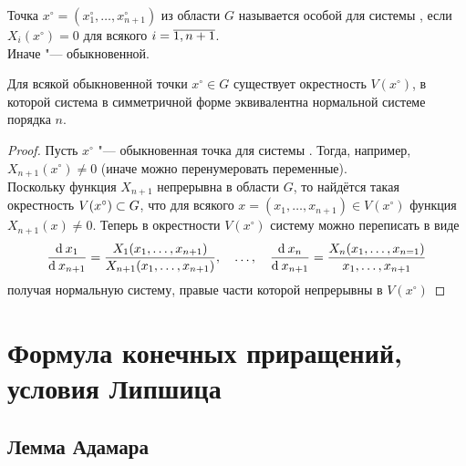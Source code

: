\begin{definition}
    Точка $ x^\circ = (x_1^\circ, \dots, x_{n + 1}^\circ) $ из области $ G $ называется особой для системы , если $ X_i(x^\circ) = 0 $ для всякого $ i = \overline{1, n + 1} $. \\
    Иначе "--- обыкновенной.
\end{definition}

\begin{theorem}
    Для всякой обыкновенной точки $ x^\circ \in G $ существует окрестность $ V(x^\circ) $, в которой система в симметричной форме  эквивалентна нормальной системе  порядка $ n $.
\end{theorem}

\begin{proof}
    Пусть $ x^\circ $ "--- обыкновенная точка для системы . Тогда, например, $ X_{n + 1}(x^\circ) \ne 0 $ (иначе можно перенумеровать переменные). \\
    Поскольку функция $ X_{n + 1} $ непрерывна в области $ G $, то найдётся такая окрестность $ V(x^\circ) \subset G $, что для всякого $ x = (x_1, \dots, x_{n + 1}) \in V(x^\circ) $ функция $ X_{n + 1}(x) \ne 0 $. Теперь в окрестности $ V(x^\circ) $ систему  можно переписать в виде
    $$ \frac{\operatorname{d}^{} x_1}{\operatorname{d}^{} x_{n + 1}} = \frac{X_1(x_1, \dots, x_{n + 1})}{X_{n + 1}(x_1, \dots, x_{n + 1})}, \quad \dots, \quad \frac{\operatorname{d}^{} x_n}{\operatorname{d}^{} x_{n + 1}} = \frac{X_n(x_1, \dots, x_{n = 1})}{x_1, \dots, x_{n + 1}} $$
    получая нормальную систему, правые части которой непрерывны в $ V(x^\circ) $
\end{proof}

\section{Формула конечных приращений, условия Липшица}

\subsection{Лемма Адамара}

